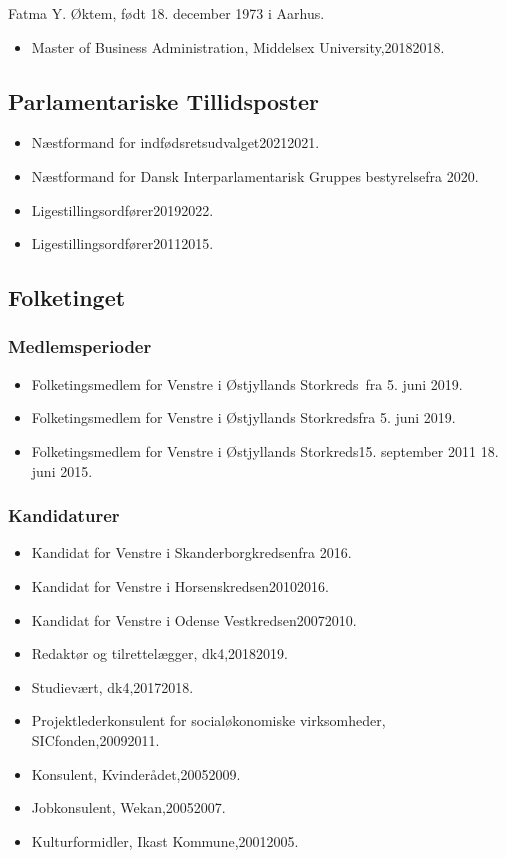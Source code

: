 \documentclass[11pt, a4paper]{awesome-cv}
\begin{document}
\makecvheader[R]
\makelettertitle
\begin{cvletter}
Fatma Y. Øktem, født 18. december 1973 i Aarhus.

\begin{itemize}
\item Master of Business Administration, Middelsex University,20182018.
\end{itemize}
\subsection*{Parlamentariske Tillidsposter}
\begin{itemize}
\item Næstformand for indfødsretsudvalget20212021.
\item Næstformand for Dansk Interparlamentarisk Gruppes bestyrelsefra 2020.
\item Ligestillingsordfører20192022.
\item Ligestillingsordfører20112015.
\end{itemize}
\subsection*{Folketinget}
\subsubsection*{Medlemsperioder}
\begin{itemize}
\item Folketingsmedlem for Venstre i Østjyllands Storkreds fra 5. juni 2019.
\item Folketingsmedlem for Venstre i Østjyllands Storkredsfra 5. juni 2019.
\item Folketingsmedlem for Venstre i Østjyllands Storkreds15. september 2011  18. juni 2015.
\end{itemize}
\subsubsection*{Kandidaturer}
\begin{itemize}
\item Kandidat for Venstre i Skanderborgkredsenfra 2016.
\item Kandidat for Venstre i Horsenskredsen20102016.
\item Kandidat for Venstre i Odense Vestkredsen20072010.
\end{itemize}
\begin{itemize}
\item Redaktør og tilrettelægger, dk4,20182019.
\item Studievært, dk4,20172018.
\item Projektlederkonsulent for socialøkonomiske virksomheder, SICfonden,20092011.
\item Konsulent, Kvinderådet,20052009.
\item Jobkonsulent, Wekan,20052007.
\item Kulturformidler, Ikast Kommune,20012005.
\end{itemize}
\end{cvletter}
\end{document}
